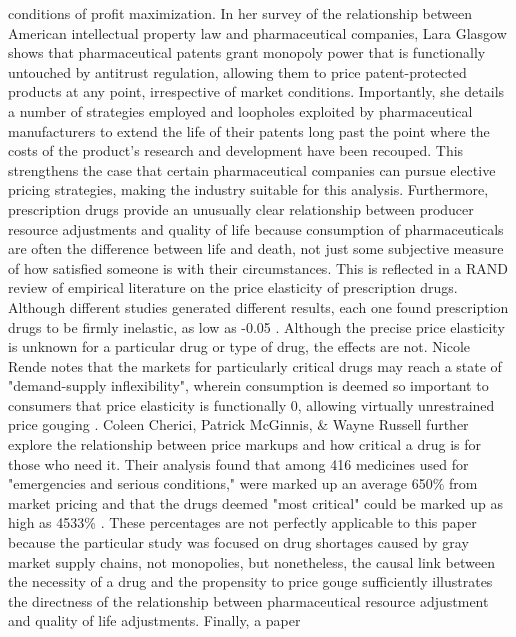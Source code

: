 \documentclass[12pt,english]{article} \usepackage{mathptmx}
\begin{document}
conditions of profit maximization. In her survey of the relationship 
between American intellectual property law and pharmaceutical companies, 
Lara Glasgow shows that pharmaceutical patents grant monopoly power that 
is functionally untouched by antitrust regulation, allowing them to 
price patent-protected products at any point, irrespective of market 
conditions\cite{glasgow_2001}. Importantly, she details a number of 
strategies employed and loopholes exploited by pharmaceutical 
manufacturers to extend the life of their patents long past the point 
where the costs of the product's research and development have been 
recouped\cite{glasgow_2001}. This strengthens the case that certain 
pharmaceutical companies can pursue elective pricing strategies, making 
the industry suitable for this analysis. Furthermore, prescription drugs 
provide an unusually clear relationship between producer resource 
adjustments and quality of life because consumption of pharmaceuticals 
are often the difference between life and death, not just some 
subjective measure of how satisfied someone is with their circumstances. 
This is reflected in a RAND review of empirical literature on the price 
elasticity of prescription drugs. Although different studies generated 
different results, each one found prescription drugs to be firmly 
inelastic, as low as -0.05 \cite{rand02}. Although the precise price 
elasticity is unknown for a particular drug or type of drug, the effects 
are not. Nicole Rende notes that the markets for particularly critical 
drugs may reach a state of "demand-supply inflexibility", wherein 
consumption is deemed so important to consumers that price elasticity is 
functionally 0, allowing virtually unrestrained price gouging 
\cite{rende_2019}. Coleen Cherici, Patrick McGinnis, & Wayne Russell 
further explore the relationship between price markups and how critical 
a drug is for those who need it. Their analysis found that among 416 
medicines used for "emergencies and serious conditions," were marked up 
an average 650\% from market pricing and that the drugs deemed "most 
critical" could be marked up as high as 4533\% \cite{pha11}. These 
percentages are not perfectly applicable to this paper because the 
particular study was focused on drug shortages caused by gray market 
supply chains, not monopolies, but nonetheless, the causal link between 
the necessity of a drug and the propensity to price gouge sufficiently 
illustrates the directness of the relationship between pharmaceutical 
resource adjustment and quality of life adjustments. Finally, a paper 
\end{document}
